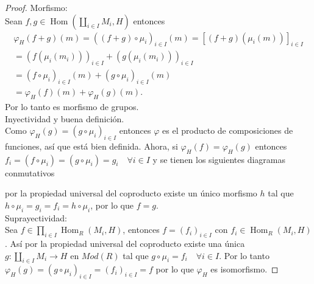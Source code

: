 \documentclass{article}
\begin{document}
\begin{enumerate}[label=\textbf{Ej \arabic*.}]
\begin{proof}
Morfismo: \\Sean $f,g\in  \operatorname{Hom}\left(\displaystyle\coprod_{i\in I}M_i,H\right)$ entonces
\begin{gather*}
\varphi_H(f+g)(m)=((f+g)\circ \mu_i)_{i\in I}(m)= [(f+g)(\mu_i(m))]_{i\in I} \\
=(f(\mu_i(m_i)))_{i\in I}+(g(\mu_i(m_i)))_{i\in I}\\
=(f\circ \mu_i)_{i\in I}(m)+(g\circ \mu_i)_{i\in I}(m)\\
=\varphi_H(f)(m)+\varphi_H(g)(m).
\end{gather*}
Por lo tanto es morfismo de grupos.\\

Inyectividad y buena definición.\\

Como $\varphi_H(g)= (g\circ \mu_i)_{i\in I}$ entonces $\varphi$ es el producto de composiciones de funciones, así que está bien definida. Ahora,
si $\varphi_H(f)=\varphi_H(g)$ entonces $ f_i=(f\circ \mu_i)=(g\circ \mu_i)=g_i\quad \forall i\in I $ y se tienen los siguientes diagramas conmutativos


por la propiedad universal del coproducto existe un único morfismo $h$ tal que $h\circ\mu_i=g_i=f_i=h\circ\mu_i$, por lo que $f=g$.\\

Suprayectividad:\\
Sea $f\in \prod_{i\in I}\operatorname{Hom}_R\left(M_i,H\right)$, entonces $f=(f_i)_{i\in I}$ con $f_i\in \operatorname{Hom}_R\left(M_i,H\right)$. 
Así por la propiedad universal del coproducto existe una única \\$g\colon\displaystyle\coprod_{i\in I}M_i\longrightarrow H$ en $Mod(R)$
tal que $g\circ \mu_i=f_i\quad \forall i\in I$. Por lo tanto $\varphi_H(g)=(g\circ\mu_i)_{i\in I}=(f_i)_{i\in I}=f$ por lo que $\varphi_H$ es isomorfismo.
\end{proof}



\end{enumerate}
\end{document}
